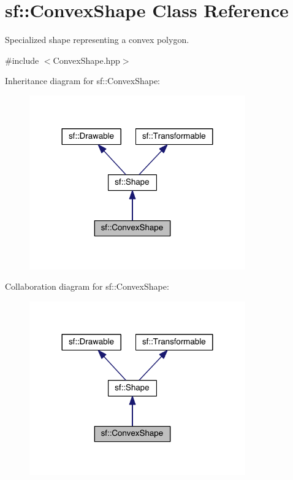 \hypertarget{classsf_1_1_convex_shape}{\section{sf\-:\-:Convex\-Shape Class Reference}
\label{classsf_1_1_convex_shape}
}


Specialized shape representing a convex polygon.  




{\ttfamily \#include $<$Convex\-Shape.\-hpp$>$}



Inheritance diagram for sf\-:\-:Convex\-Shape\-:
\nopagebreak
\begin{figure}[H]
\begin{center}
\leavevmode
\includegraphics[width=264pt]{classsf_1_1_convex_shape__inherit__graph}
\end{center}
\end{figure}


Collaboration diagram for sf\-:\-:Convex\-Shape\-:
\nopagebreak
\begin{figure}[H]
\begin{center}
\leavevmode
\includegraphics[width=264pt]{classsf_1_1_convex_shape__coll__graph}
\end{center}
\end{figure}
